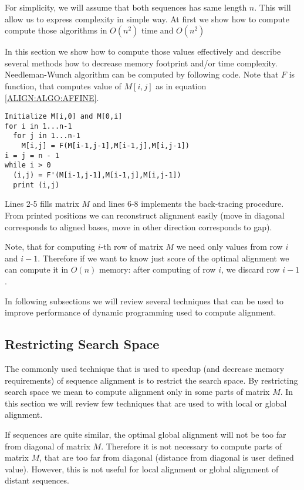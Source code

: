 For simplicity, we will assume that both sequences has same length $n$. This
will allow us to express complexity in simple way.  At first we show how
to compute compute those algorithms in $O(n^2)$ time and $O(n^2)$ 

In this section we show how to compute those values effectively and describe
several methods how to decrease memory footprint and/or time complexity.
Needleman-Wunch algorithm can be computed by following code. Note that $F$ is
function, that computes value of $M[i,j]$ as in equation
\ref{ALIGN:ALGO:AFFINE}.

\begin{lstlisting}
Initialize M[i,0] and M[0,i]
for i in 1...n-1
  for j in 1...n-1
    M[i,j] = F(M[i-1,j-1],M[i-1,j],M[i,j-1])
i = j = n - 1
while i > 0
  (i,j) = F'(M[i-1,j-1],M[i-1,j],M[i,j-1])
  print (i,j)
\end{lstlisting}

Lines 2-5 fills matrix $M$ and lines 6-8 implements the back-tracing procedure.
From printed positions we can reconstruct alignment easily (move in diagonal
corresponds to aligned bases, move in other direction corresponds to gap).

Note, that for computing $i$-th row of matrix $M$ we need only values from row
$i$ and $i-1$. Therefore if we want to know just score of the optimal alignment
we can compute it in $O(n)$ memory: after computing of row $i$, we discard row
$i-1$.

In following subsections we will review several techniques that can be used to
improve performance of dynamic programming used to compute alignment.

\subsection{Restricting Search Space}

The commonly used technique that is used to speedup (and decrease memory
requirements) of sequence alignment is to restrict the search space. By
restricting search space we mean to compute alignment only in some parts of
matrix $M$. In this section we will review few techniques that are used to with
local or global alignment.

If sequences are quite similar, the optimal global alignment will not be too far
from diagonal of matrix $M$. Therefore it is not necessary to compute parts of
matrix $M$, that are too far from diagonal (distance from diagonal is user
defined value). However, this is not useful for local alignment or global
alignment of distant sequences.

